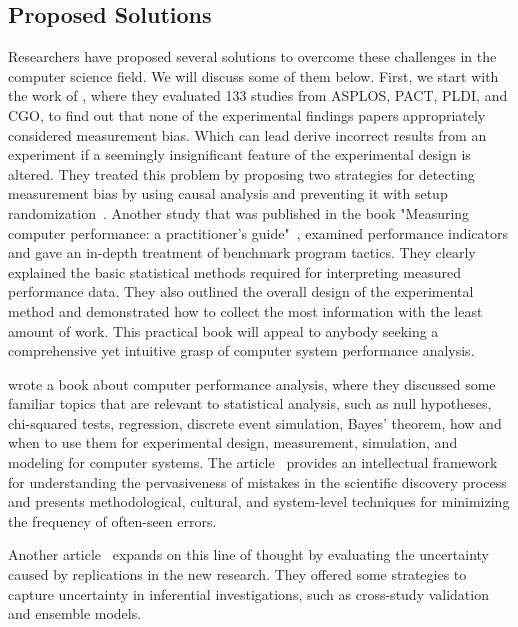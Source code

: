 \subsection{Proposed Solutions}\label{sec:soa_reproducibility}
Researchers have proposed several solutions to overcome these challenges in the computer science field. We will discuss some of them below.
First, we start with the work of \citeauthor{mytkowicz2009producing}, where they evaluated 133 studies from ASPLOS, PACT, PLDI, and CGO, to find out that none of the experimental findings papers appropriately considered measurement bias. Which can lead derive incorrect results from an experiment if a seemingly insignificant feature of the experimental design is altered. They treated this problem by proposing two strategies for detecting measurement bias by using causal analysis and preventing it with setup randomization~\cite{mytkowicz2009producing}.
Another study that was published in the book "Measuring computer performance: a practitioner's guide"~\cite{lilja2005measuring},\citeauthor{lilja2005measuring} examined performance indicators and gave an in-depth treatment of benchmark program tactics. They clearly explained the basic statistical methods required for interpreting measured performance data.
They also outlined the overall design of the experimental method and demonstrated how to collect the most information with the least amount of work.
This practical book will appeal to anybody seeking a comprehensive yet intuitive grasp of computer system performance analysis.

\citeauthor{bukh1992art} wrote a book about computer performance analysis, where they discussed some familiar topics that are relevant to statistical analysis, such as null hypotheses, chi-squared tests, regression, discrete event simulation, Bayes' theorem, how and when to use them for experimental design, measurement, simulation, and modeling for computer systems.
The article~\cite{brown2018issues} provides an intellectual framework for understanding the pervasiveness of mistakes in the scientific discovery process and presents methodological, cultural, and system-level techniques for minimizing the frequency of often-seen errors.

Another article~\cite{patil2018training} expands on this line of thought by evaluating the uncertainty caused by replications in the new research.
They offered some strategies to capture uncertainty in inferential investigations, such as cross-study validation and ensemble models.

